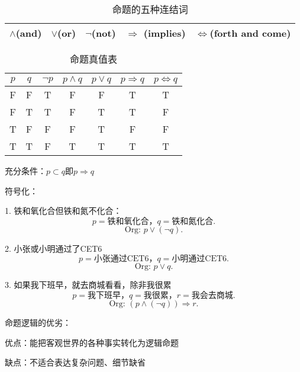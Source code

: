 \begin{table}[htpb]
	\centering
	\caption{命题的五种连结词}
	\label{tab:命题的五种连结词}
	\begin{tabular}{ccccc}
	\toprule
	$\land$(and) & $\lor$(or) & $\neg$(not) & $\Rightarrow$ (implies) & $\Leftrightarrow$(forth and come)\\
	\bottomrule
	\end{tabular}
\end{table}

\begin{table}[htpb]
    \centering
    \caption{命题真值表}
    \label{tab:命题真值表}
    \begin{tabular}{ccccccc}
    \toprule
    $p$ & $q$& $\neg p$& $p\land q$& $p\lor q$& $p\Rightarrow q$& $p\Leftrightarrow q$\\
    \midrule
    F&F&T&F&F&T&T\\
    F&T&T&F&T&T&F\\
    T&F&F&F&T&F&F\\
    T&T&F&T&T&T&T\\
    \bottomrule
    \end{tabular}
\end{table}

\begin{notation}
	充分条件：$p\subset q\text{即} p\Rightarrow q$
\end{notation}

\begin{eg}
	符号化：

	1. 铁和氧化合但铁和氮不化合：
	\[
		p= \text{铁和氧化合，}q=\text{铁和氮化合}
	.\] 
	\[
		\text{Org: }p \lor \left( \neg q \right) 
	.\] 

	2. 小张或小明通过了CET6
	\[
		p=\text{小张通过CET6，}q=\text{小明通过CET6}
	.\] 
	\[
		\text{Org: }p \lor q
	.\] 

	3. 如果我下班早，就去商城看看，除非我很累
	\[
		p=\text{我下班早，}q=\text{我很累，}r=\text{我会去商城}
	.\] 
	\[
		\text{Org: }\left( p\land \left( \neg q \right)  \right) \Rightarrow r
	.\] 
\end{eg}

\begin{notation}
	命题逻辑的优劣：

	优点：能把客观世界的各种事实转化为逻辑命题

	缺点：不适合表达复杂问题、细节缺省
\end{notation}

